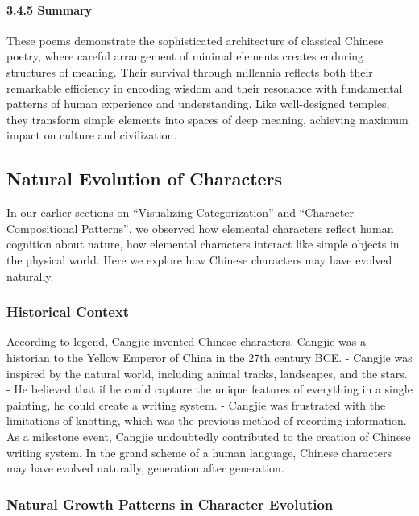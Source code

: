 \paragraph{3.4.5 Summary}\label{summary}

These poems demonstrate the sophisticated architecture of classical
Chinese poetry, where careful arrangement of minimal elements creates
enduring structures of meaning. Their survival through millennia
reflects both their remarkable efficiency in encoding wisdom and their
resonance with fundamental patterns of human experience and
understanding. Like well-designed temples, they transform simple
elements into spaces of deep meaning, achieving maximum impact on
culture and civilization.

\subsection{Natural Evolution of
Characters}\label{natural-evolution-of-characters}

In our earlier sections on ``Visualizing Categorization'' and
``Character Compositional Patterns'', we observed how elemental
characters reflect human cognition about nature, how elemental
characters interact like simple objects in the physical world. Here we
explore how Chinese characters may have evolved naturally.

\subsubsection{Historical Context}\label{historical-context}

According to legend, Cangjie invented Chinese characters. Cangjie was a
historian to the Yellow Emperor of China in the 27th century BCE. -
Cangjie was inspired by the natural world, including animal tracks,
landscapes, and the stars. - He believed that if he could capture the
unique features of everything in a single painting, he could create a
writing system. - Cangjie was frustrated with the limitations of
knotting, which was the previous method of recording information. As a
milestone event, Cangjie undoubtedly contributed to the creation of
Chinese writing system. In the grand scheme of a human language, Chinese
characters may have evolved naturally, generation after generation.

\subsubsection{Natural Growth Patterns in Character
Evolution}\label{natural-growth-patterns-in-character-evolution}

